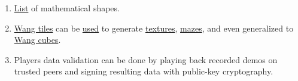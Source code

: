 \documentclass[12pt]{article}
\begin{document}
\begin{enumerate}
{            E.g. keyboard, joystick signals, etc.
        }.
        To allow bot to perceive everything that it needs, it may be a good
        idea to design the game around the concept of bot from the very
        beginning.
    \item
        \href{http://en.wikipedia.org/wiki/List_of_mathematical_shapes}%
        {List} of mathematical shapes.
    \item
        \href{http://en.wikipedia.org/wiki/Wang_tile}{Wang tiles}
        can be
        \href{http://procworld.blogspot.com/2013/01/tile-genetics.html}{used}
        to generate
        \href{http://graphics.stanford.edu/papers/tile_mapping_gh2004/final/%
paper_final.pdf}{textures},
        \href{http://nothings.org/gamedev/herringbone/}{mazes},
        and even generalized to
        \href{http://www.jucs.org/jucs_1_10/an_aperiodic_set_of/Culik_II_K.pdf}%
        {Wang cubes}.
    \item
        Players data validation can be done by playing back recorded demos on
        trusted peers and signing resulting data with public-key cryptography.
        
\end{enumerate}
\end{document}
